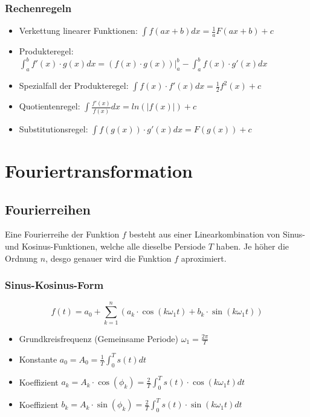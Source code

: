 \subsubsection{Rechenregeln}
\begin{itemize}
  \item Verkettung linearer Funktionen: $\int f(ax+b)dx = \frac{1}{a}F(ax+b) + c$
  \item Produkteregel: $\int_a^b f'(x) \cdot g(x) dx =
    (f(x) \cdot g(x))|^b_a - \int_a^b f(x) \cdot g'(x) dx$
  \item Spezialfall der Produkteregel: $\int f(x) \cdot f'(x) dx = \frac{1}{2}f^2(x) + c$
  \item Quotientenregel: $\int \frac{f'(x)}{f(x)}dx = ln(|f(x)|) + c$
  \item Substitutionsregel: $ \int f(g(x)) \cdot g'(x) dx = F(g(x)) + c$
\end{itemize}


\section{Fouriertransformation}
\subsection{Fourierreihen}
Eine Fourierreihe der Funktion $f$ besteht aus einer Linearkombination
von Sinus- und Kosinus-Funktionen, welche alle dieselbe Persiode $T$
haben. Je höher die Ordnung $n$, desgo genauer wird die Funktion $f$ aproximiert.

\subsubsection{Sinus-Kosinus-Form}
\[
  f(t) = a_0 + \sum_{k=1}^{n}
  (a_k \cdot \cos(k \omega_1 t) + b_k \cdot \sin(k \omega_1 t))
\]
\begin{itemize}
  \item Grundkreisfrequenz (Gemeinsame Periode) $\omega_1 = \frac{2\pi}{T}$
  \item Konstante $a_0 = A_0 = \frac{1}{T}\int_0^T s(t) dt$
  \item Koeffizient $a_k = A_k \cdot \cos(\phi_k) =
    \frac{2}{T} \int_0^T s(t) \cdot \cos(k \omega_1 t) dt$
  \item Koeffizient $b_k = A_k \cdot \sin(\phi_k) =
    \frac{2}{T} \int_0^T s(t) \cdot \sin(k \omega_1 t) dt$
\end{itemize}

